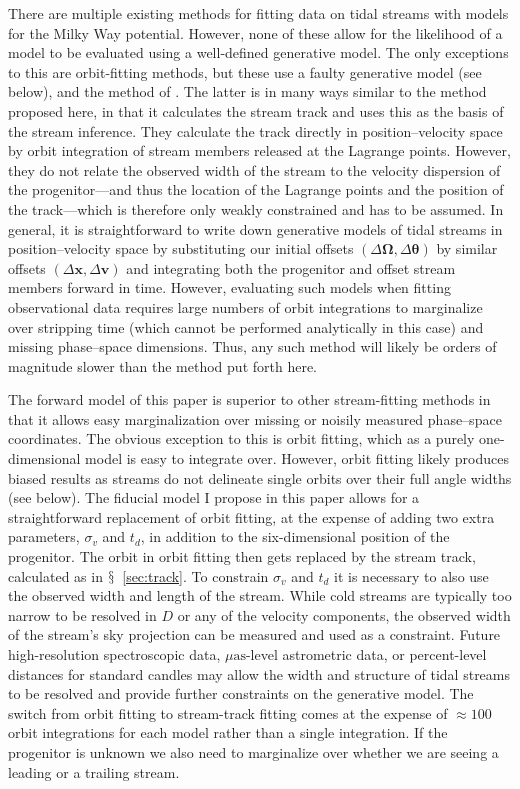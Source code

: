 \documentclass[12pt,preprint]{aastex}
\newcommand{\sectionname}{$\mathsection$}
\renewcommand{\vec}[1]{\ensuremath{\mathbf{#1}}}
\newcommand{\vecx}{\ensuremath{\vec{x}}}
\newcommand{\vecv}{\ensuremath{\vec{v}}}
\newcommand{\veco}{\ensuremath{\vec{\Omega}}}
\newcommand{\veca}{\ensuremath{\boldsymbol\theta}}
\newcommand{\sigv}{\ensuremath{\sigma_v}}
\begin{document}
There are multiple existing methods for fitting data on tidal streams
with models for the Milky Way potential. However, none of these allow
for the likelihood of a model to be evaluated using a well-defined
generative model. The only exceptions to this are orbit-fitting
methods, but these use a faulty generative model (see below), and the
method of \citet{Varghese11a}. The latter is in many ways similar to
the method proposed here, in that it calculates the stream track and
uses this as the basis of the stream inference. They calculate the
track directly in position--velocity space by orbit integration of
stream members released at the Lagrange points. However, they do not
relate the observed width of the stream to the velocity dispersion of
the progenitor---and thus the location of the Lagrange points and the
position of the track---which is therefore only weakly constrained and
has to be assumed. In general, it is straightforward to write down
generative models of tidal streams in position--velocity space by
substituting our initial offsets $(\Delta \veco,\Delta \veca)$ by
similar offsets $(\Delta \vecx,\Delta \vecv)$ and integrating both the
progenitor and offset stream members forward in time. However,
evaluating such models when fitting observational data requires large
numbers of orbit integrations to marginalize over stripping time
(which cannot be performed analytically in this case) and missing
phase--space dimensions. Thus, any such method will likely be orders
of magnitude slower than the method put forth here.

The forward model of this paper is superior to other stream-fitting
methods in that it allows easy marginalization over missing or noisily
measured phase--space coordinates. The obvious exception to this is
orbit fitting, which as a purely one-dimensional model is easy to
integrate over. However, orbit fitting likely produces biased results
as streams do not delineate single orbits over their full angle widths
(see below). The fiducial model I propose in this paper allows for a
straightforward replacement of orbit fitting, at the expense of adding
two extra parameters, $\sigv$ and $t_d$, in addition to the
six-dimensional position of the progenitor. The orbit in orbit fitting
then gets replaced by the stream track, calculated as in
\sectionname~\ref{sec:track}. To constrain $\sigv$ and $t_d$ it is
necessary to also use the observed width and length of the
stream. While cold streams are typically too narrow to be resolved in
$D$ or any of the velocity components, the observed width of the
stream's sky projection can be measured and used as a
constraint. Future high-resolution spectroscopic data,
$\mu\mathrm{as}$-level astrometric data, or percent-level distances
for standard candles may allow the width and structure of tidal
streams to be resolved and provide further constraints on the
generative model. The switch from orbit fitting to stream-track
fitting comes at the expense of $\approx100$ orbit integrations for
each model rather than a single integration. If the progenitor is
unknown we also need to marginalize over whether we are seeing a
leading or a trailing stream.
\end{document}

